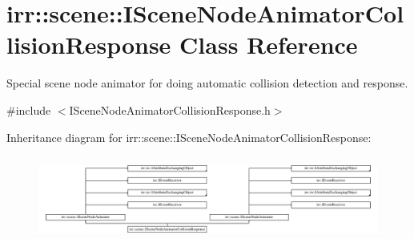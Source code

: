 \hypertarget{classirr_1_1scene_1_1ISceneNodeAnimatorCollisionResponse}{}\section{irr\+:\+:scene\+:\+:I\+Scene\+Node\+Animator\+Collision\+Response Class Reference}
\label{classirr_1_1scene_1_1ISceneNodeAnimatorCollisionResponse}


Special scene node animator for doing automatic collision detection and response.  




{\ttfamily \#include $<$I\+Scene\+Node\+Animator\+Collision\+Response.\+h$>$}

Inheritance diagram for irr\+:\+:scene\+:\+:I\+Scene\+Node\+Animator\+Collision\+Response\+:\begin{figure}[H]
\begin{center}
\leavevmode
\includegraphics[height=2.790698cm]{classirr_1_1scene_1_1ISceneNodeAnimatorCollisionResponse}
\end{center}
\end{figure}
